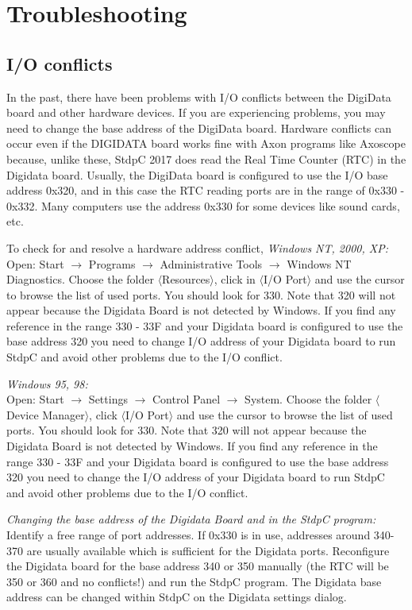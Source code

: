 \documentclass{article}
\begin{document}
\section{Troubleshooting}
\subsection{I/O conflicts}
 
In the past, there have been problems with I/O conflicts between the
DigiData board and other hardware devices. If you are experiencing
problems, you may need to change the base address of the DigiData
board. Hardware conflicts can occur even if the DIGIDATA board works
fine with Axon programs like Axoscope because, unlike these, StdpC
2017 does read the Real Time Counter (RTC) in the Digidata
board. Usually, the DigiData board is configured to use the I/O base
address 0x320, and in this case the RTC reading ports are in the range
of 0x330 - 0x332. Many computers use the address 0x330 for some devices like
sound cards, etc.

To check for and resolve a hardware address conflict,
\noindent
{\em Windows NT, 2000, XP: } \\
Open: Start $\rightarrow$ Programs $\rightarrow$ Administrative Tools
$\rightarrow$ Windows NT Diagnostics. Choose the folder
$\langle$Resources$\rangle$, click in $\langle$I/O Port$\rangle$ and use the
cursor to browse the list of used ports.  You should look for 330. Note that
320 will not appear because the Digidata Board is not detected by Windows. If
you find any reference in the range 330 - 33F and your Digidata board is
configured to use the base address 320 you need to change I/O address of your
Digidata board to run StdpC and avoid other problems due to the I/O
conflict.

\noindent
{\em Windows 95, 98: } \\ Open: Start $\rightarrow$ Settings
$\rightarrow$ Control Panel $\rightarrow$ System. Choose the folder
$\langle$Device Manager$\rangle$, click $\langle$I/O Port$\rangle$ and
use the cursor to browse the list of used ports. You should look for
330.  Note that 320 will not appear because the Digidata Board is not
detected by Windows. If you find any reference in the range 330 - 33F
and your Digidata board is configured to use the base address 320 you
need to change the I/O address of your Digidata board to run StdpC
and avoid other problems due to the I/O conflict.
 
\noindent
{\em Changing the base address of the Digidata Board and in the StdpC
  program: } \\ Identify a free range of port addresses.  If 0x330 is
in use, addresses around 340-370 are usually available which is
sufficient for the Digidata ports. Reconfigure the Digidata
board for the base address 340 or 350 manually (the RTC will be 350 or
360 and no conflicts!) and run the StdpC program. The Digidata base
address can be changed within StdpC on the Digidata settings dialog.
\end{document}

